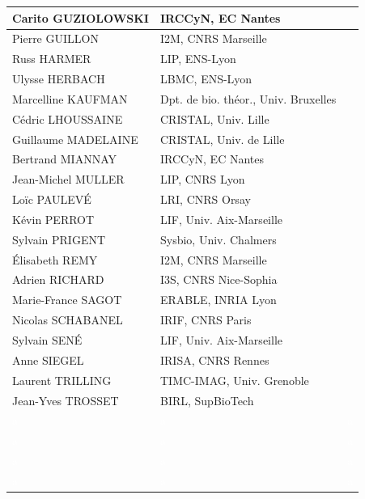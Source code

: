 \documentclass[10pt, a4paper]{article}
\begin{document}
{\begin{tabular}{|p{}|p{}|l|}
		Carito GUZIOLOWSKI & IRCCyN, EC Nantes & \\\hline
		Pierre GUILLON & I2M, CNRS Marseille & \\\hline
		Russ HARMER & LIP, ENS-Lyon & \\\hline
		Ulysse HERBACH & LBMC, ENS-Lyon & \\\hline
		Marcelline KAUFMAN & Dpt. de bio. théor., Univ. Bruxelles & \\\hline
		Cédric LHOUSSAINE & CRISTAL, Univ. Lille & \\\hline
		Guillaume MADELAINE & CRISTAL, Univ. de Lille & \\\hline
		Bertrand MIANNAY & IRCCyN, EC Nantes & \\\hline
		Jean-Michel MULLER & LIP, CNRS Lyon & \\\hline
		Loïc PAULEVÉ & LRI, CNRS Orsay & \\\hline
		Kévin PERROT & LIF, Univ. Aix-Marseille & \\\hline
		Sylvain PRIGENT & Sysbio, Univ. Chalmers & \\\hline
		Élisabeth REMY & I2M, CNRS Marseille & \\\hline
		Adrien RICHARD & I3S, CNRS Nice-Sophia & \\\hline
		Marie-France SAGOT & ERABLE, INRIA Lyon & \\\hline
		Nicolas SCHABANEL & IRIF, CNRS Paris & \\\hline
		Sylvain SENÉ & LIF, Univ. Aix-Marseille & \\\hline
		Anne SIEGEL & IRISA, CNRS Rennes & \\\hline
		Laurent TRILLING & TIMC-IMAG, Univ. Grenoble & \\\hline
		Jean-Yves TROSSET & BIRL, SupBioTech & \\\hline
		\textcolor{White}{a} & \textcolor{White}{a} & \textcolor{White}{a}\\
		\textcolor{White}{a} & \textcolor{White}{a} & \textcolor{White}{a}\\
		\textcolor{White}{a} & \textcolor{White}{a} & \textcolor{White}{a}\\
		\textcolor{White}{a} & \textcolor{White}{a} & \textcolor{White}{a}\\	\hline
	\end{tabular}
}

\pagebreak
\end{document}
